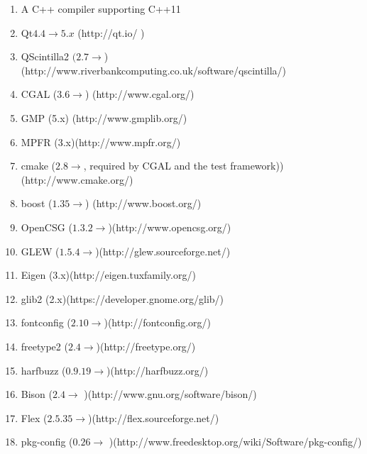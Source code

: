 \begin{enumerate} 
	\item A C++ compiler supporting C++11
	
	\item Qt$  4.4 \rightarrow 5.x $ (http://qt.io/ )
	
	\item QScintilla2 $ (2.7 \rightarrow $)(http://www.riverbankcomputing.co.uk/software/qscintilla/)
	
	\item CGAL ($ 3.6 \rightarrow $) (http://www.cgal.org/)
	
	\item GMP (5.x) (http://www.gmplib.org/)
	
	\item MPFR (3.x)(http://www.mpfr.org/)
	
	\item cmake ($ 2.8 \rightarrow $, required by CGAL and the test framework))(http://www.cmake.org/)
	
	\item boost ($ 1.35 \rightarrow $) (http://www.boost.org/)
	
	\item OpenCSG ($ 1.3.2 \rightarrow $)(http://www.opencsg.org/)
	
	\item GLEW ($ 1.5.4 \rightarrow $)(http://glew.sourceforge.net/)
	
	\item Eigen (3.x)(http://eigen.tuxfamily.org/)
	
	\item glib2 (2.x)(https://developer.gnome.org/glib/)
	
	\item fontconfig ($ 2.10 \rightarrow  $)(http://fontconfig.org/)
	
	\item freetype2 ($ 2.4 \rightarrow  $)(http://freetype.org/)
	
	\item harfbuzz ($ 0.9.19 \rightarrow  $)(http://harfbuzz.org/)
	
	\item Bison ($ 2.4 \rightarrow $ )(http://www.gnu.org/software/bison/)
	
	\item Flex ($ 2.5.35 \rightarrow  $)(http://flex.sourceforge.net/)
	
	\item pkg-config ($ 0.26 \rightarrow $ )(http://www.freedesktop.org/wiki/Software/pkg-config/)
	
\end{enumerate}


